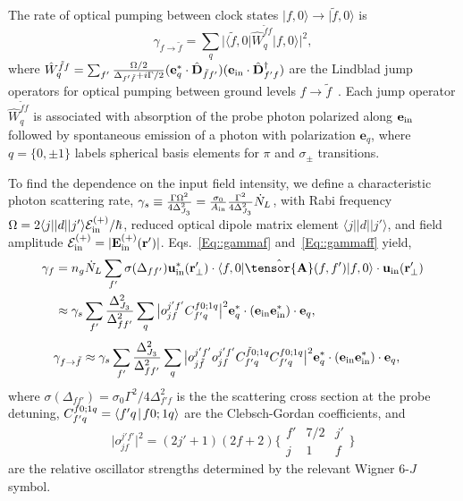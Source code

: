 \documentclass[preprint, aps,pra,onecolumn]{revtex4-1} %
\def\br{\mathbf{r}}
\def\bra#1{\langle{#1}\rvert}%
\def\ket#1{\lvert{#1}\rangle}%
\def\Braket#1#2{\mathinner{\langle{#1}\! \mid\! {#2} \rangle}}
\newcommand{\mbf}[1]{\mathbf{#1}}
\newcommand{\inp}{{\rm in}}
\begin{document}
\begin{appendix}
The rate of optical pumping between clock states $\ket{f,0} \rightarrow \ket{\tilde{f},0}$ is
	\begin{equation}\label{Eq::gammaff}
		\gamma_{f \rightarrow \tilde{f} } 
		=\sum_{q}\big| \bra{\tilde{f},0} \hat{W}_q^{\tilde{f}f} \ket{f,0} \big|^2,
	\end{equation}
where $ \hat{W}_q^{\tilde{f}f} = \sum_{f'}\frac{\Omega/2}{\Delta_{f'\tilde{f}}+i\Gamma/2}(\mathbf{e}_q^*\cdot\hat{\mathbf{D}}_{\tilde{f} f'} )(\mathbf{e}_{\rm in}\cdot \hat{\mathbf{D}}^\dagger_{f'f} ) $ are the Lindblad jump operators for optical pumping between ground levels $ f\rightarrow \tilde{f} $~\cite{deutsch_quantum_2010}. 
Each jump operator $\hat{W}_q^{\tilde{f}f}$ is associated with absorption of the probe photon polarized along $ \mathbf{e}_{\rm in} $ followed by spontaneous emission of a photon with polarization $ \mathbf{e}_q $, where $q= \{0,\pm 1\}$ labels spherical basis elements for $\pi$ and $ \sigma_\pm$ transitions.  

To find the dependence on the input field intensity, we define a characteristic photon scattering rate, $\gamma_s \equiv \frac{\Gamma\Omega^2}{4\Delta_{J_3}^2}= \frac{\sigma_0}{A_{\rm in}}\frac{\Gamma^2}{4 \Delta_{J_3}^2} \dot{N}_L $, with Rabi frequency $ \Omega=2\bra{j}|d|\ket{j'}\mathcal{E}^{(+)}_{\rm in}/\hbar $, reduced optical dipole matrix element $\bra{j}|d|\ket{j'}$, and field amplitude $ \mathcal{E}^{(+)}_{\rm in}=|\mathbf{E}_{\rm in}^{(+)}(\br')| $.
Eqs.~\eqref{Eq::gammaf} and~\eqref{Eq::gammaff} yield,
\begin{subequations}
	\begin{align}
		\gamma_f &=n_g\dot{N}_L  \sum_{f'} \sigma (\Delta_{ff'} ) \mathbf{u}^*_\inp(\br'_\perp)\cdot \bra{f,0} \hat{\tensor{\mbf{A}}}(f,f') \ket{f,0}  \cdot \mathbf{u}_\inp(\br'_\perp)\\
		&\approx  \gamma_s \sum_{f'} \frac{\Delta_{J_3}^2}{\Delta_{ff'}^2}\sum_q \big| o_{jf}^{j'f'}C_{f'q}^{f0;1 q} \big|^2 \mathbf{e}_q^* \cdot (\mathbf{e}_{\rm in}\mathbf{e}_{\rm in}^* )\cdot \mathbf{e}_q, 
	\end{align}
\end{subequations}
	\begin{align}
		\gamma_{f \rightarrow \tilde{f}} 
		&\approx \gamma_s \sum_{f'} \frac{\Delta_{J_3}^2}{\Delta_{ff'}^2}\sum_q \big| o_{j\tilde{f}}^{j'f'} o_{jf}^{j'f'}C_{f'q}^{\tilde{f}0;1 q}C_{f'q}^{f0;1q} \big|^2 \mathbf{e}_q^* \cdot (\mathbf{e}_{\rm in}\mathbf{e}_{\rm in}^* )\cdot \mathbf{e}_q,
	\end{align}
where $ \sigma (\Delta_{ff'} )  = \sigma_0 \Gamma^2/4\Delta^2_{f' f}$ is the the scattering cross section at the probe detuning, $ C_{f'q}^{f0;1 q}=\Braket{f'q}{f0;1q}$ are the Clebsch-Gordan coefficients, and
\begin{equation}
\big| o_{jf}^{j'f'} \big|^2=(2j'+1)(2f+2) \bigg\{
\begin{array}{ccc}
f' & 7/2 & j' \\
 j & 1 & f 
 \end{array}
 \bigg\}
\end{equation}
are the relative oscillator strengths determined by the relevant Wigner 6-$J$ symbol.


\end{appendix}
\end{document}
